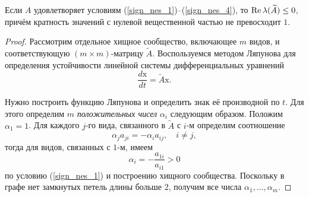     \begin{theorem} \label{theorem_sign_spectre}
        Если \(A\) удовлетворяет условиям (\ref{sign_nes_1})--(\ref{sign_nes_4}), то \(\operatorname{Re} \lambda(\widetilde{A}) \leq 0 \), причём кратность значений с нулевой вещественной частью не превосходит \(1\).
    \end{theorem}
    \begin{proof}
        Рассмотрим отдельное хищное сообщество, включающее \(m\) видов, и соответствующую \((m \times m)\)-матрицу \(\widetilde{A}\). Воспользуемся методом Ляпунова для определения устойчивости линейной системы дифференциальных уравнений 
        \begin{equation} \label{sign_hunter_ode}
            \frac{d \mathrm{x}}{dt} = \widetilde{A} \mathrm{x}.
        \end{equation}

        Нужно построить функцию Ляпунова и определить знак её производной по \(t\). Для этого определим \(m\) \textit{положительных чисел} \(\alpha_i\) следующим образом. Положим \(\alpha_1 = 1\). Для каждого \(j\)-го вида, связанного в \(\widetilde{A}\) с \(i\)-м определим соотношение
        \begin{equation} \label{sign_conntcnted_ij}
            \alpha_j a_{ji} = -\alpha_i a_{ij}, \quad i \neq j,
        \end{equation}
        тогда для видов, связанных с \(1\)-м, имеем
        \begin{equation} \label{sign_conntcnted_1}
            \alpha_i = - \frac{a_{1i}}{a_{i1}} > 0
        \end{equation}
        по условию (\ref{sign_nes_1}) и построению хищного сообщества. Поскольку в графе нет замкнутых петель длины больше 2, получим все числа \(\alpha_1, \dots, \alpha_m\).


\end{proof}
